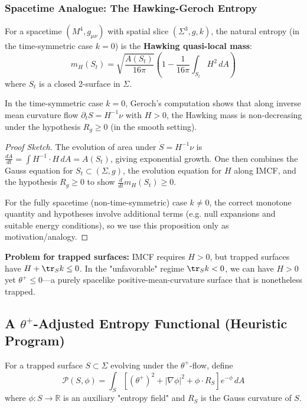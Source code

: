 \subsubsection{Spacetime Analogue: The Hawking-Geroch Entropy}

For a spacetime $(M^4, g_{\mu\nu})$ with spatial slice $(\Sigma^3, g, k)$, the natural entropy (in the time-symmetric case $k=0$) is the \textbf{Hawking quasi-local mass}:
\begin{equation}
m_H(S_t) 
= \sqrt{\frac{A(S_t)}{16\pi}}\left(1 - \frac{1}{16\pi}\int_{S_t} H^2 \, dA\right)
\label{eq:hawking-mass-app}
\end{equation}
where $S_t$ is a closed 2-surface in $\Sigma$.

\begin{proposition}
\label{prop:hawking-imcf-app}
In the time-symmetric case $k=0$, Geroch's computation shows that along inverse mean curvature flow $\partial_t S = H^{-1}\nu$ with $H>0$, the Hawking mass is non-decreasing under the hypothesis $R_g\ge 0$ (in the smooth setting).
\end{proposition}

\begin{proof}[Proof Sketch]
The evolution of area under $\dot{S} = H^{-1}\nu$ is $\frac{dA}{dt} = \int H^{-1} \cdot H \, dA = A(S_t)$, giving exponential growth. One then combines the Gauss equation for $S_t\subset (\Sigma,g)$, the evolution equation for $H$ along IMCF, and the hypothesis $R_g\ge 0$ to show $\frac{d}{dt}m_H(S_t)\ge 0$.

For the fully spacetime (non-time-symmetric) case $k\ne 0$, the correct monotone quantity and hypotheses involve additional terms (e.g. null expansions and suitable energy conditions), so we use this proposition only as motivation/analogy.
\end{proof}

\textbf{Problem for trapped surfaces:} IMCF requires $H > 0$, but trapped surfaces have $H + \tr_S k \leq 0$. In the "unfavorable" regime $\tr_S k < 0$, we can have $H > 0$ yet $\theta^+ \leq 0$---a purely spacelike positive-mean-curvature surface that is nonetheless trapped.

\subsection{A \texorpdfstring{$\theta^+$}{theta+}-Adjusted Entropy Functional (Heuristic Program)}

\begin{definition}
\label{def:spacetime-perelman-app}
For a trapped surface $S \subset \Sigma$ evolving under the $\theta^+$-flow, define
\begin{equation}
\mathcal{P}(S, \phi) = \int_S \left[(\theta^+)^2 + |\nabla\phi|^2 + \phi \cdot R_S\right]e^{-\phi} \, dA
\label{eq:penrose-entropy-app}
\end{equation}
where $\phi: S \to \mathbb{R}$ is an auxiliary "entropy field" and $R_S$ is the Gauss curvature of $S$.
\end{definition}

